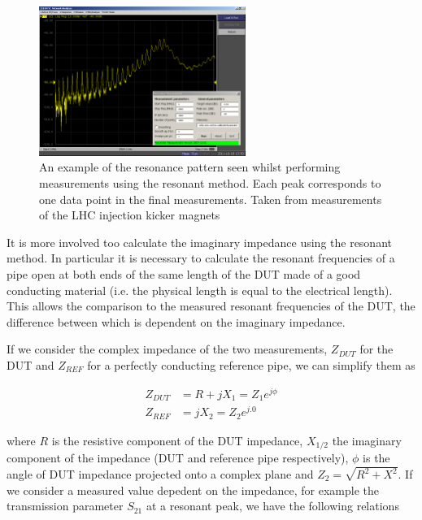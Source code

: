 \begin{figure}
\begin{center}
\includegraphics[width=0.6\textwidth]{Bench_Top_Measurements/figures/coax-resonator.png}
\end{center}
\caption{An example of the resonance pattern seen whilst performing measurements using the resonant method. Each peak corresponds to one data point in the final measurements. Taken from measurements of the LHC injection kicker magnets}
\label{fig:res-resonancce-examples}
\end{figure}

It is more involved too calculate the imaginary impedance using the resonant method. In particular it is necessary to calculate the resonant frequencies of a pipe open at both ends of the same length of the DUT made of a good conducting material (i.e. the physical length is equal to the electrical length). This allows the comparison to the measured resonant frequencies of the DUT, the difference between which is dependent on the imaginary impedance.

If we consider the complex impedance of the two measurements, $Z_{DUT}$ for the DUT and $Z_{REF}$ for a perfectly conducting reference pipe, we can simplify them as

\begin{align}
Z_{DUT} & =  R + jX_{1}  =  Z_{1}e^{j \phi} \\
Z_{REF} & =  jX_{2}  =  Z_{2}e^{j.0}
\end{align}

where $R$ is the resistive component of the DUT impedance, $X_{1/2}$ the imaginary component of the impedance (DUT and reference pipe respectively), $\phi$ is the angle of DUT impedance projected onto a complex plane and $Z_{2} = \sqrt{R^{2} + X^{2}}$. If we consider a measured value depedent on the impedance, for example the transmission parameter $S_{21}$ at a resonant peak, we have the following relations

